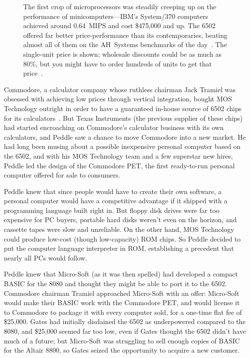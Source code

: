 \begin{figure}
  
  \caption{\label{fig:price_performance} 
    The first crop of microprocessors was steadily creeping up on the
    performance of minicomputers---IBM's System/370 computers achieved
    around 0.64~MIPS and cost \$475,000 and up.
    The 6502 offered far better
    price-performance than its contemporaries,
    beating almost all of them on the AH~Systems benchmarks of
    the day~\cite{edn75:6502}.  
    The single-unit price is shown; wholesale discounts could be
    as much as 80\%, but you might have to order hundreds of units to
    get that price~\cite[p. 228]{ceruzzi}.}
\end{figure}



Commodore, a calculator company whose ruthless chairman Jack Tramiel was
obsessed with achieving low prices through vertical integration, bought
MOS Technology outright in order to have a guaranteed in-house source of
6502 chips for its calculators~\cite{commodore}.
But Texas Instruments (the previous supplier of these chips) had started
encroaching on Commodore's calculator business with its own calculators,
and Peddle saw a chance to move Commodore into a new market.
He had long been musing about a possible inexpensive personal computer
based on the 6502, and with his MOS Technology team and a few superstar
new hires, Peddle led the design of the Commodore PET, 
the first ready-to-run personal computer offered for sale to consumers.

Peddle knew that since people would have to create their own software, a
personal computer would have a competitive advantage if it shipped with
a programming language built right in.
But floppy disk drives were far too expensive for PC buyers, portable
hard disks weren't even on the horizon, and cassette tapes were slow and
unreliable.  On the other hand, MOS Technology could produce low-cost
(though low-capacity) ROM 
chips.  So Peddle decided to  put the computer language interpreter in ROM, establishing
a precedent that nearly all PCs would follow.

Peddle knew that Micro-Soft (as it was then spelled) 
had developed a compact BASIC for the 8080
and thought they might be able to port it to the 6502.
Commodore chairman Tramiel approached Micro-Soft with an offer:
Micro-Soft would make their BASIC work with the Commodore PET, and would
license it to Commodore to package it with every computer sold, for a
one-time flat fee of \$25,000.
Gates had initially disdained the 6502 as underpowered compared to the
8080, and \$25,000 seemed far too low, even if Gates thought the 6502
didn't have much of a future; but Micro-Soft was struggling to
sell enough copies of BASIC for the Altair 8800, so Gates
seized the opportunity to acquire a new customer.


